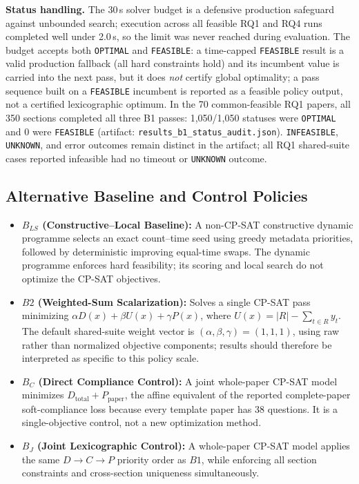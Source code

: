 \documentclass[runningheads]{llncs}
\begin{document}
\noindent\textbf{Status handling.} The 30\,s solver budget is a defensive production safeguard against unbounded search; execution across all feasible RQ1 and RQ4 runs completed well under 2.0\,s, so the limit was never reached during evaluation. The budget accepts both \texttt{OPTIMAL} and \texttt{FEASIBLE}: a time-capped \texttt{FEASIBLE} result is a valid production fallback (all hard constraints hold) and its incumbent value is carried into the next pass, but it does \emph{not} certify global optimality; a pass sequence built on a \texttt{FEASIBLE} incumbent is reported as a feasible policy output, not a certified lexicographic optimum. In the 70 common-feasible RQ1 papers, all 350 sections completed all three B1 passes: 1,050/1,050 statuses were \texttt{OPTIMAL} and 0 were \texttt{FEASIBLE} (artifact: \texttt{results\_b1\_status\_audit.json}). \texttt{INFEASIBLE}, \texttt{UNKNOWN}, and error outcomes remain distinct in the artifact; all RQ1 shared-suite cases reported infeasible had no timeout or \texttt{UNKNOWN} outcome.

\subsection{Alternative Baseline and Control Policies}
\begin{itemize}
    \item \textbf{$B_{LS}$ (Constructive--Local Baseline):} A non-CP-SAT constructive dynamic programme selects an exact count--time seed using greedy metadata priorities, followed by deterministic improving equal-time swaps. The dynamic programme enforces hard feasibility; its scoring and local search do not optimize the CP-SAT objectives.
    \item \textbf{$B2$ (Weighted-Sum Scalarization):} Solves a single CP-SAT pass minimizing $\alpha D(x) + \beta U(x) + \gamma P(x)$, where $U(x) = |R| - \sum_{t\in R} y_t$. The default shared-suite weight vector is $(\alpha,\beta,\gamma)=(1,1,1)$, using raw rather than normalized objective components; results should therefore be interpreted as specific to this policy scale.
    \item \textbf{$B_C$ (Direct Compliance Control):} A joint whole-paper CP-SAT model minimizes $D_{\mathrm{total}}+P_{\mathrm{paper}}$, the affine equivalent of the reported complete-paper soft-compliance loss because every template paper has 38 questions. It is a single-objective control, not a new optimization method.
    \item \textbf{$B_J$ (Joint Lexicographic Control):} A whole-paper CP-SAT model applies the same $D\!\to\!C\!\to\!P$ priority order as $B1$, while enforcing all section constraints and cross-section uniqueness simultaneously.
\end{itemize}
\end{document}
